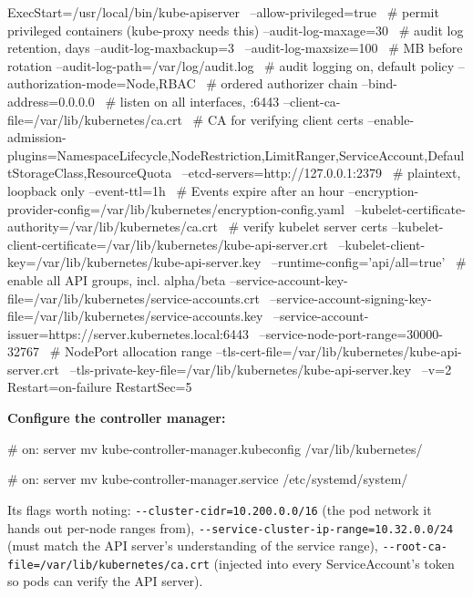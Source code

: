 \documentclass[11pt,oneside]{report}
\begin{document}
\begin{outlst}
[Service]
ExecStart=/usr/local/bin/kube-apiserver \
  --allow-privileged=true \                       # permit privileged containers (kube-proxy needs this)
  --audit-log-maxage=30 \                         # audit log retention, days
  --audit-log-maxbackup=3 \
  --audit-log-maxsize=100 \                       # MB before rotation
  --audit-log-path=/var/log/audit.log \           # audit logging on, default policy
  --authorization-mode=Node,RBAC \                # ordered authorizer chain
  --bind-address=0.0.0.0 \                        # listen on all interfaces, :6443
  --client-ca-file=/var/lib/kubernetes/ca.crt \   # CA for verifying client certs
  --enable-admission-plugins=NamespaceLifecycle,NodeRestriction,LimitRanger,ServiceAccount,DefaultStorageClass,ResourceQuota \
  --etcd-servers=http://127.0.0.1:2379 \          # plaintext, loopback only
  --event-ttl=1h \                                # Events expire after an hour
  --encryption-provider-config=/var/lib/kubernetes/encryption-config.yaml \
  --kubelet-certificate-authority=/var/lib/kubernetes/ca.crt \   # verify kubelet server certs
  --kubelet-client-certificate=/var/lib/kubernetes/kube-api-server.crt \
  --kubelet-client-key=/var/lib/kubernetes/kube-api-server.key \
  --runtime-config='api/all=true' \               # enable all API groups, incl. alpha/beta
  --service-account-key-file=/var/lib/kubernetes/service-accounts.crt \
  --service-account-signing-key-file=/var/lib/kubernetes/service-accounts.key \
  --service-account-issuer=https://server.kubernetes.local:6443 \
  --service-node-port-range=30000-32767 \         # NodePort allocation range
  --tls-cert-file=/var/lib/kubernetes/kube-api-server.crt \
  --tls-private-key-file=/var/lib/kubernetes/kube-api-server.key \
  --v=2
Restart=on-failure
RestartSec=5
\end{outlst}

\textbf{Configure
the controller
manager:}

\begin{cmdlst}
# on: server
mv kube-controller-manager.kubeconfig /var/lib/kubernetes/
\end{cmdlst}

\begin{cmdlst}
# on: server
mv kube-controller-manager.service /etc/systemd/system/
\end{cmdlst}

Its flags worth
noting:
\texttt{-\/-cluster-}\allowbreak{}\texttt{cidr=10.}\allowbreak{}\texttt{200.}\allowbreak{}\texttt{0.}\allowbreak{}\texttt{0/}\allowbreak{}\texttt{16}
(the pod network it
hands out per-node
ranges from),
\texttt{-\/-service-}\allowbreak{}\texttt{cluster-}\allowbreak{}\texttt{ip-}\allowbreak{}\texttt{range=10.}\allowbreak{}\texttt{32.}\allowbreak{}\texttt{0.}\allowbreak{}\texttt{0/}\allowbreak{}\texttt{24}
(must match the API
server's
understanding of the
service range),
\texttt{-\/-root-}\allowbreak{}\texttt{ca-}\allowbreak{}\texttt{file=/}\allowbreak{}\texttt{var/}\allowbreak{}\texttt{lib/}\allowbreak{}\texttt{kubernetes/}\allowbreak{}\texttt{ca.}\allowbreak{}\texttt{crt}
(injected into every
ServiceAccount's
token so pods can
verify the API
server).
\end{document}
